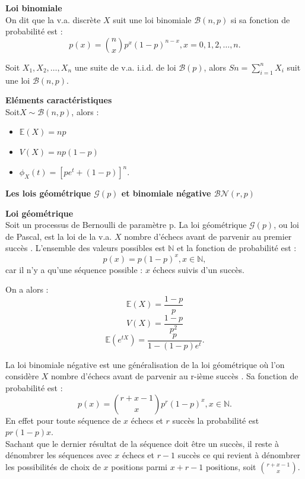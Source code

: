 \documentclass[../PolyS4.tex]{subfiles}
\begin{document}
\begin{Def}\textbf{Loi binomiale}\\
 On dit que la v.a. discrète $X$ suit une loi binomiale $\mathcal{B}(n, p)$ si
sa fonction de probabilité est :$$
p(x) =
\binom{n}{x}p^x(1 -p)^{n-x} , x = 0, 1, 2, \dots, n .$$
\end{Def}

\begin{Prop}

 Soit $X_1,X_2,\dots ,X_n$ une suite de v.a. i.i.d. de loi $\mathcal{B}(p)$, alors
$Sn =\sum_{i=1}^n X_i$ suit une loi $\mathcal{B}(n, p)$.
\end{Prop}




\begin{Prop}\textbf{Eléments caractéristiques}\\

Soit$ X \sim \mathcal{ B}(n, p)$, alors :\\
\begin{itemize}
\item $\mathbb{E}(X) = np$
\item $V (X) = np(1 - p)$
\item $\phi_X(t) = [pe^t + (1 - p)]^n.$
\end{itemize}

\end{Prop}



\textbf{ Les lois g\' eom\' etrique $\mathcal{G}(p)$ et binomiale n\' egative $\mathcal{BN}(r,p)$}

\begin{Def}\textbf{Loi géométrique}\\
Soit un processus de Bernoulli de paramètre p. La loi géométrique $\mathcal{G}(p)$, ou loi de Pascal, est la loi de la v.a. $X$ \og nombre d'échecs avant de parvenir au premier succès\fg{} . L'ensemble des valeurs possibles est $\mathbb{N}$ et la fonction de probabilité est :
$$p(x) = p(1 - p)^x, x \in \mathbb{N} ,$$
car il n'y a qu'une séquence possible : $x$ échecs suivis d'un succès.\\
\end{Def}
\begin{Prop}
On a alors :
$$\mathbb{E}(X) =\dfrac{1- p}{p}$$
$$V (X) =\dfrac{1 - p}{p^2}$$
$$\mathbb{E}(e^{tX}) =\dfrac{p}{1 - (1 - p)e^t}
.$$
\end{Prop}

La loi binomiale négative est une généralisation de la loi géométrique où l'on considère $X$ \og nombre d'échecs avant de parvenir au r-ième succès\fg{} . Sa fonction de probabilité est :
$$p(x) =\binom{r + x - 1}{x}p^r(1 - p)^x, x \in \mathbb{ N}.$$
En effet pour toute séquence de $x$ échecs et $r$ succès la probabilité est $pr(1-p)x$.\\
Sachant que le dernier résultat de la séquence doit être un succès, il reste à dénombrer les séquences avec $x$ échecs et $r-1$ succès ce qui revient à dénombrer les possibilités de choix de $x$ positions parmi $x + r - 1$ positions, soit
$\binom{r+x-1}{ x}$.
\end{document}
